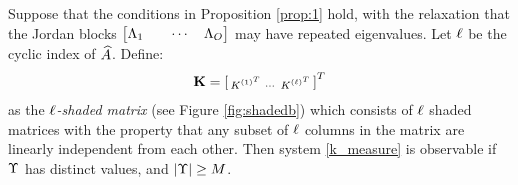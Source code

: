 \begin{theorem}\label{thm:1}
 Suppose that the conditions in Proposition \ref{prop:1} hold, with the relaxation that the Jordan blocks $\begin{bmatrix}\Lambda_1 & &\cdots & \Lambda_{O}\end{bmatrix}$ may have repeated eigenvalues. Let $\ell$ be the cyclic index of $\widehat{A}$. Define:
 \begin{align}\eqlabel{empKShadFull}
  \empKShadFull = \left[\begin{smallmatrix}
                    \empK^{{(1)}^T} & 
                    \cdots &
                    \empK^{{(\minmeas)}^T}
                  \end{smallmatrix}\right]^T
 \end{align}
 as the \emph{$\ell$-shaded matrix} (see Figure \ref{fig:shadedb}) which consists of $\ell$ shaded matrices with the property that any subset of
 $\ell$
 columns in the matrix are linearly independent from each
 other. Then system \eqref{k_measure} is observable if $\Upsilon$ has distinct values, and $|\Upsilon| \geq M$.
\end{theorem}
